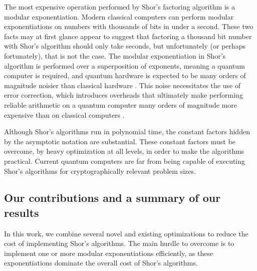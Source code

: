 \documentclass[superscriptaddress,notitlepage,longbibliography]{revtex4-1}
\theoremstyle{definition}
\theoremstyle{definition}
\begin{document}
The most expensive operation performed by Shor's factoring algorithm is a modular exponentiation.
Modern classical computers can perform modular exponentiations on numbers with thousands of bits in under a second.
These two facts may at first glance appear to suggest that factoring a thousand bit number with Shor's algorithm should only take seconds, but unfortunately (or perhaps fortunately), that is not the case.
The modular exponentiation in Shor's algorithm is performed over a superposition of exponents, meaning a quantum computer is required, and quantum hardware is expected to be many orders of magnitude noisier than classical hardware \cite{schroeder2009dram,Bare13,Kim2014}.
This noise necessitates the use of error correction, which introduces overheads that ultimately make performing reliable arithmetic on a quantum computer many orders of magnitude more expensive than on classical computers \cite{fowler2012surfacecodereview, campbell2018constraintsatisfaction}.

Although Shor's algorithms run in polynomial time, the constant factors hidden by the asymptotic notation are substantial.
These constant factors must be overcome, by heavy optimization at all levels, in order to make the algorithms practical.
Current quantum computers are far from being capable of executing Shor's algorithms for cryptographically relevant problem sizes.

\subsection{Our contributions and a summary of our results}

In this work, we combine several novel and existing optimizations to reduce the cost of implementing Shor's algorithms.
The main hurdle to overcome is to implement one or more modular exponentiations efficiently, as these exponentiations dominate the overall cost of Shor's algorithms.
\end{document}
